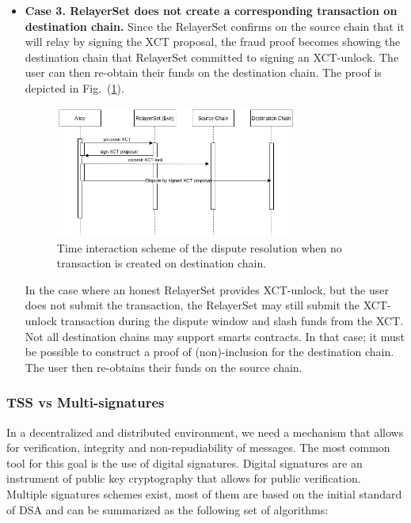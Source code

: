 \begin{itemize}
        \item \textbf{Case 3. RelayerSet does not create a corresponding transaction on destination chain.}
        Since the RelayerSet confirms on the source chain that it will relay by signing the XCT proposal, the fraud proof becomes showing the destination chain that RelayerSet committed to signing an XCT-unlock. The user can then re-obtain their funds on the destination chain. The proof is depicted in Fig.~(\ref{fig:dispute3}).
        
        \begin{figure}[h]
            \centering
            \includegraphics[width=0.75\textwidth]{images/mosaic/phase3/dispute3.png}
            \caption{Time interaction scheme of the dispute resolution when no transaction is created on destination chain. }
            \label{fig:dispute3}
        \end{figure}
        
        In the case where an honest RelayerSet provides XCT-unlock, but the user does not submit the transaction, the RelayerSet may still submit the XCT-unlock transaction during the dispute window and slash funds from the XCT.
        Not all destination chains may support smarts contracts. In that case; it must be possible to construct a proof of (non)-inclusion for the destination chain. The user then re-obtains their funds on the source chain.

    \end{itemize}


\subsubsection{TSS vs Multi-signatures}

In a decentralized and distributed environment, we need a mechanism that allows for verification, integrity and non-repudiability of messages. The most common tool for this goal is the use of digital signatures. Digital signatures are an instrument of public key cryptography \cite{Diffie1976NewCryptography} that allows for public verification. Multiple signatures schemes exist, most of them are based on the initial standard of DSA \cite{DSSStandard} and can be summarized as the following set of algorithms:

